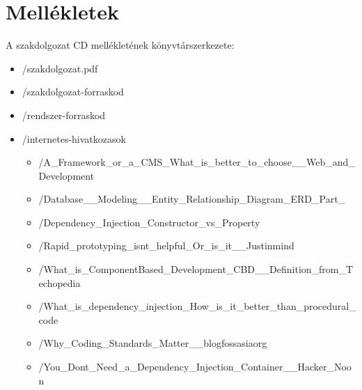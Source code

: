 \documentclass[a4paper,12pt,oneside]{report}
\begin{document}
\newpage
\thispagestyle{empty}
\section*{Mellékletek}

A szakdolgozat CD mellékletének könyvtárszerkezete:

\begin{itemize}
	\item[] /szakdolgozat.pdf
	\item[] /szakdolgozat-forraskod
	\item[] /rendszer-forraskod
	\item[] /internetes-hivatkozasok
		\begin{itemize}
            \item[] /A_Framework_or_a_CMS_What_is_better_to_choose__Web_and_Development
            \item[] /Database__Modeling__Entity_Relationship_Diagram_ERD_Part_
            \item[] /Dependency_Injection_Constructor_vs_Property
            \item[] /Rapid_prototyping_isnt_helpful_Or_is_it__Justinmind
            \item[] /What_is_ComponentBased_Development_CBD__Definition_from_Techopedia
            \item[] /What_is_dependency_injection_How_is_it_better_than_procedural_code
            \item[] /Why_Coding_Standards_Matter__blogfossasiaorg
            \item[] /You_Dont_Need_a_Dependency_Injection_Container__Hacker_Noon
		\end{itemize}
\end{itemize}
\end{document}
